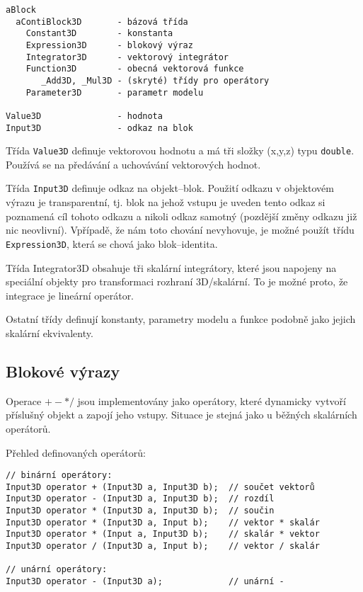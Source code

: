 \documentclass[a4paper]{article}
\begin{document}
\begin{verbatim}
aBlock
  aContiBlock3D       - bázová třída
    Constant3D        - konstanta
    Expression3D      - blokový výraz
    Integrator3D      - vektorový integrátor
    Function3D        - obecná vektorová funkce
       _Add3D, _Mul3D - (skryté) třídy pro operátory
    Parameter3D       - parametr modelu

Value3D               - hodnota
Input3D               - odkaz na blok

\end{verbatim}

Třída \verb|Value3D| definuje vektorovou hodnotu a má tři složky (x,y,z) typu
\verb|double|. Používá se na předávání a uchovávání vektorových hodnot.

Třída \verb|Input3D| definuje odkaz na objekt--blok. Použití odkazu v
objektovém výrazu je transparentní, tj. blok na jehož vstupu je uveden tento
odkaz si poznamená cíl tohoto odkazu a nikoli odkaz samotný (pozdější změny
odkazu již nic neovlivní). Vpřípadě, že nám toto chování nevyhovuje, je
možné použít třídu \verb|Expression3D|, která se chová jako blok--identita.

Třída Integrator3D obsahuje tři skalární integrátory, které jsou napojeny na
speciální objekty pro transformaci rozhraní 3D/skalární. To je možné proto, že
integrace je lineární operátor.

Ostatní třídy definují konstanty, parametry modelu a funkce podobně jako
jejich skalární ekvivalenty.


\subsection{Blokové výrazy}

Operace $ + - * /$ jsou implementovány jako operátory, které dynamicky vytvoří
příslušný objekt a zapojí jeho vstupy. Situace je stejná jako u běžných
skalárních operátorů.

Přehled definovaných operátorů:

{
\small
\begin{verbatim}
// binární operátory:
Input3D operator + (Input3D a, Input3D b);  // součet vektorů
Input3D operator - (Input3D a, Input3D b);  // rozdíl
Input3D operator * (Input3D a, Input3D b);  // součin
Input3D operator * (Input3D a, Input b);    // vektor * skalár
Input3D operator * (Input a, Input3D b);    // skalár * vektor
Input3D operator / (Input3D a, Input b);    // vektor / skalár

// unární operátory:
Input3D operator - (Input3D a);             // unární -
\end{verbatim}
}
\end{document}
